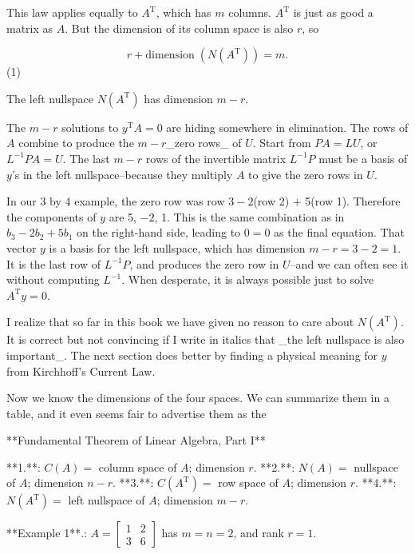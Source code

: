 This law applies equally to \(A^{\mathrm{T}}\), which has \(m\) columns. \(A^{\mathrm{T}}\) is just as good a matrix as \(A\). But the dimension of its column space is also \(r\), so

\[r+\mathrm{dimension}\;\left(N(A^{\mathrm{T}})\right)=m.\] (1)

The left nullspace \(N(A^{\mathrm{T}})\) has dimension \(m-r\).

The \(m-r\) solutions to \(y^{\mathrm{T}}A=0\) are hiding somewhere in elimination. The rows of \(A\) combine to produce the \(m-r\)_zero rows_ of \(U\). Start from \(PA=LU\), or \(L^{-1}PA=U\). The last \(m-r\) rows of the invertible matrix \(L^{-1}P\) must be a basis of \(y\)'s in the left nullspace--because they multiply \(A\) to give the zero rows in \(U\).

In our 3 by 4 example, the zero row was row \(3-2\)(row 2) \(+\) 5(row 1). Therefore the components of \(y\) are 5, \(-2\), 1. This is the same combination as in \(b_{3}-2b_{2}+5b_{1}\) on the right-hand side, leading to \(0=0\) as the final equation. That vector \(y\) is a basis for the left nullspace, which has dimension \(m-r=3-2=1\). It is the last row of \(L^{-1}P\), and produces the zero row in \(U\)--and we can often see it without computing \(L^{-1}\). When desperate, it is always possible just to solve \(A^{\mathrm{T}}y=0\).

I realize that so far in this book we have given no reason to care about \(N(A^{\mathrm{T}})\). It is correct but not convincing if I write in italics that _the left nullspace is also important_. The next section does better by finding a physical meaning for \(y\) from Kirchhoff's Current Law.

Now we know the dimensions of the four spaces. We can summarize them in a table, and it even seems fair to advertise them as the

**Fundamental Theorem of Linear Algebra, Part I**

**1.**: \(C(A)=\) column space of \(A\); dimension \(r\).
**2.**: \(N(A)=\) nullspace of \(A\); dimension \(n-r\).
**3.**: \(C(A^{\mathrm{T}})=\) row space of \(A\); dimension \(r\).
**4.**: \(N(A^{\mathrm{T}})=\) left nullspace of \(A\); dimension \(m-r\).

**Example 1**.: \(A=\begin{bmatrix}1&2\\ 3&6\end{bmatrix}\) has \(m=n=2\), and rank \(r=1\).

